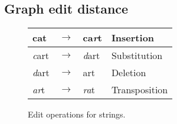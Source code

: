 \documentclass[12pt]{thesis}
\theoremstyle{plain}
\theoremstyle{definition}
\theoremstyle{remark}
\begin{document}
\subsection{Graph edit distance}

\begin{wrapfigure}{R}{0.4\textwidth}
\begin{tabular}{|lcl|l|}
\hline
cat & $\rightarrow$ & ca\textit{r}t & Insertion \\ \hline
\textit{c}art & $\rightarrow$ & \textit{d}art & Substitution \\ \hline
\textit{d}art & $\rightarrow$ & art & Deletion \\ \hline
\textit{ar}t & $\rightarrow$ & \textit{ra}t & Transposition \\ \hline
\end{tabular}
\caption{Edit operations for strings.}
\vspace{-10pt}
\label{fig:string_edit_operations}
\end{wrapfigure}
\end{document}
